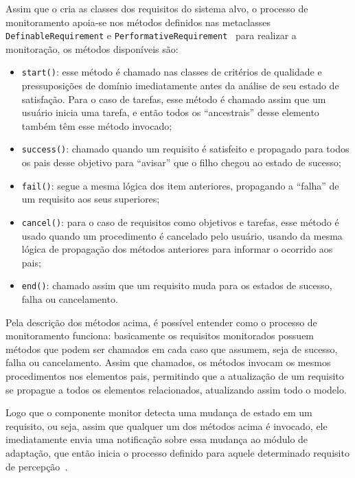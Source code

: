 Assim que o \zanshin cria as classes dos requisitos do sistema alvo, o processo de monitoramento apoia-se nos métodos definidos nas metaclasses \texttt{DefinableRequirement} e \texttt{PerformativeRequirement}~\cite{tesevitor} para realizar a monitoração, os métodos disponíveis são:
\begin{itemize}
	\item \texttt{start()}: esse método é chamado nas classes de critérios de qualidade e pressuposições de domínio imediatamente antes da análise de seu estado de satisfação. Para o caso de tarefas, esse método é chamado assim que um usuário inicia uma tarefa, e então todos os ``ancestrais'' desse elemento também têm esse método invocado;
	\item \texttt{success()}: chamado quando um requisito é satisfeito e propagado para todos os pais desse objetivo para ``avisar'' que o filho chegou ao estado de sucesso;
	\item \texttt{fail()}: segue a mesma lógica dos item anteriores, propagando a ``falha'' de um requisito aos seus superiores;
	\item \texttt{cancel()}: para o caso de requisitos como objetivos e tarefas, esse método é usado quando um procedimento é cancelado pelo usuário, usando da mesma lógica de propagação dos métodos anteriores para informar o ocorrido aos pais;
	\item \texttt{end()}: chamado assim que um requisito muda para os estados de sucesso, falha ou cancelamento.
\end{itemize}

Pela descrição dos métodos acima, é possível entender como o processo de monitoramento funciona: basicamente os requisitos monitorados possuem métodos que podem ser chamados em cada caso que assumem, seja de sucesso, falha ou cancelamento. Assim que chamados, os métodos invocam os mesmos procedimentos nos elementos pais, permitindo que a atualização de um requisito se propague a todos os elementos relacionados, atualizando assim todo o modelo.

Logo que o componente monitor detecta uma mudança de estado em um requisito, ou seja, assim que qualquer um dos métodos acima é invocado, ele imediatamente envia uma notificação sobre essa mudança ao módulo de adaptação, que então inicia o processo definido para aquele determinado requisito de percepção~\cite{tesevitor}.

